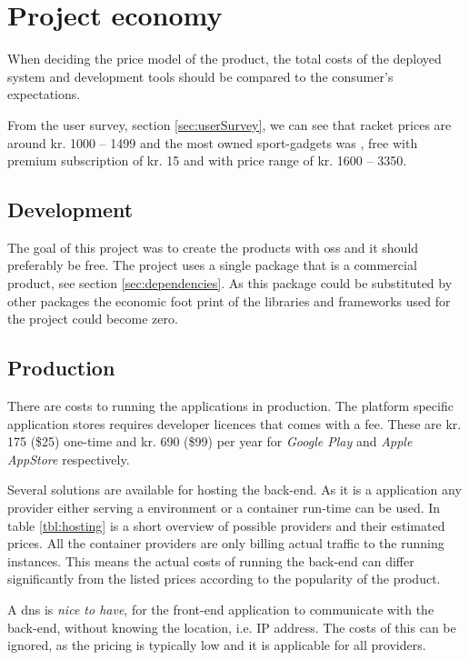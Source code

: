 \section{Project economy}
When deciding the price model of the product, the total costs of the deployed system and development tools should be compared to the consumer's expectations.

From the user survey, section \ref{sec:userSurvey}, we can see that racket prices are around kr. 1000 – 1499 and the most owned sport-gadgets was , free with premium subscription of kr. 15 and  with price range of kr. 1600 – 3350.

\subsection{Development}
The goal of this project was to create the products with \gls{oss} and it should preferably be free.
The project uses a single package that is a commercial product, see section \ref{sec:dependencies}.
As this package could be substituted by other packages the economic foot print of the libraries and frameworks used for the project could become zero.

\subsection{Production}
There are costs to running the applications in production.
The platform specific application stores requires developer licences that comes with a fee.
These are kr. 175 (\$25) one-time \citep{economy:play} and kr. 690 (\$99) per year \citep{economy:appStore} for \textit{Google Play} and \textit{Apple AppStore} respectively.

Several solutions are available for hosting the back-end.
As it is a  application any provider either serving a  environment or a container run-time can be used.
In table \ref{tbl:hosting} is a short overview of possible providers and their estimated prices.
All the container providers are only billing actual traffic to the running instances.
This means the actual costs of running the back-end can differ significantly from the listed prices according to the popularity of the product.

A \gls{dns} is \textit{nice to have}, for the front-end application to communicate with the back-end, without knowing the location, i.e. IP address.
The costs of this can be ignored, as the pricing is typically low and it is applicable for all providers.

